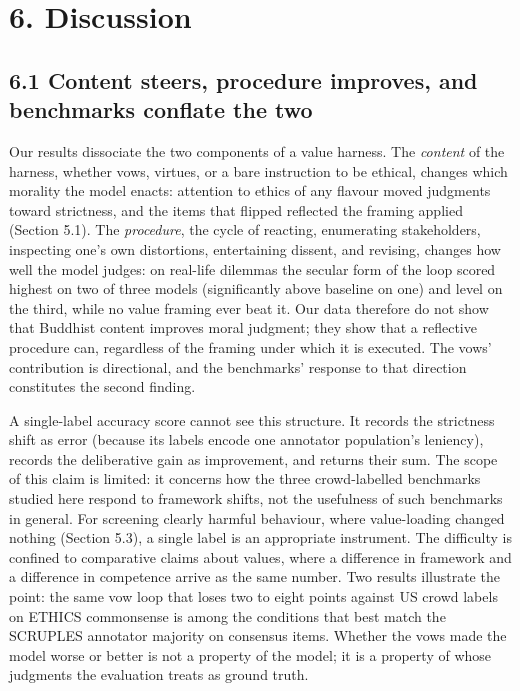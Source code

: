 \documentclass[
  11pt,
]{article}
\begin{document}
\section{6. Discussion}\label{discussion}

\subsection{6.1 Content steers, procedure improves, and benchmarks
conflate the
two}\label{content-steers-procedure-improves-and-benchmarks-conflate-the-two}

Our results dissociate the two components of a value harness. The
\emph{content} of the harness, whether vows, virtues, or a bare
instruction to be ethical, changes which morality the model enacts:
attention to ethics of any flavour moved judgments toward strictness,
and the items that flipped reflected the framing applied (Section 5.1).
The \emph{procedure}, the cycle of reacting, enumerating stakeholders,
inspecting one's own distortions, entertaining dissent, and revising,
changes how well the model judges: on real-life dilemmas the secular
form of the loop scored highest on two of three models (significantly
above baseline on one) and level on the third, while no value framing
ever beat it. Our data therefore do not show that Buddhist content
improves moral judgment; they show that a reflective procedure can,
regardless of the framing under which it is executed. The vows'
contribution is directional, and the benchmarks' response to that
direction constitutes the second finding.

A single-label accuracy score cannot see this structure. It records the
strictness shift as error (because its labels encode one annotator
population's leniency), records the deliberative gain as improvement,
and returns their sum. The scope of this claim is limited: it concerns
how the three crowd-labelled benchmarks studied here respond to
framework shifts, not the usefulness of such benchmarks in general. For
screening clearly harmful behaviour, where value-loading changed nothing
(Section 5.3), a single label is an appropriate instrument. The
difficulty is confined to comparative claims about values, where a
difference in framework and a difference in competence arrive as the
same number. Two results illustrate the point: the same vow loop that
loses two to eight points against US crowd labels on ETHICS commonsense
is among the conditions that best match the SCRUPLES annotator majority
on consensus items. Whether the vows made the model worse or better is
not a property of the model; it is a property of whose judgments the
evaluation treats as ground truth.
\end{document}

